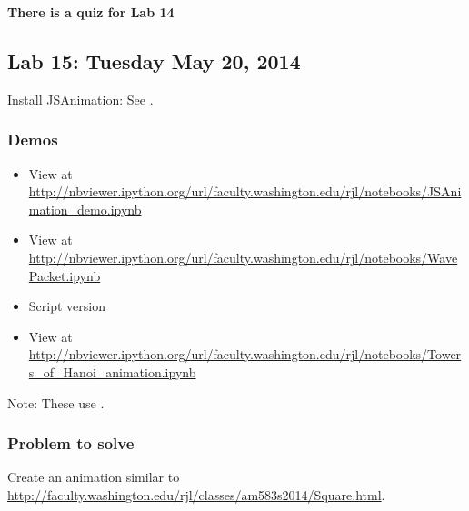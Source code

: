 \documentclass[letterpaper,10pt,english]{sphinxmanual}
\begin{document}
\textbf{There is a quiz for Lab 14}


\subsection{Lab 15: Tuesday May 20, 2014}
\label{labs/lab15:lab15}\label{labs/lab15::doc}\label{labs/lab15:lab-15-tuesday-may-20-2014}
Install JSAnimation:  See {\hyperref[animation:animation]{}}.


\subsubsection{Demos}
\label{labs/lab15:demos}\begin{itemize}
\item {} 

View at
\url{http://nbviewer.ipython.org/url/faculty.washington.edu/rjl/notebooks/JSAnimation\_demo.ipynb}

\item {} 

View at
\url{http://nbviewer.ipython.org/url/faculty.washington.edu/rjl/notebooks/WavePacket.ipynb}

\item {} 
  Script version

\item {} 

View at
\url{http://nbviewer.ipython.org/url/faculty.washington.edu/rjl/notebooks/Towers\_of\_Hanoi\_animation.ipynb}

\end{itemize}

Note: These use .


\subsubsection{Problem to solve}
\label{labs/lab15:problem-to-solve}
Create an animation similar to
\url{http://faculty.washington.edu/rjl/classes/am583s2014/Square.html}.
\end{document}
